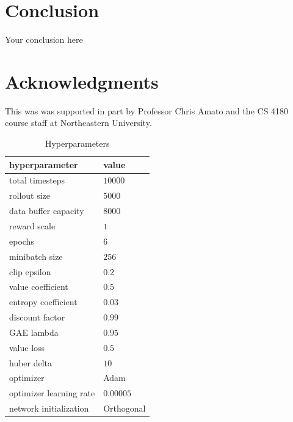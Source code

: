 \documentclass{article}
\begin{document}
\section{Conclusion}
Your conclusion here

\section*{Acknowledgments}
This was was supported in part by Professor Chris Amato and the CS 4180 course staff at Northeastern University.


\begin{table}[h]
  \caption{Hyperparameters}
   \centering
   \begin{tabular}{ll}
     \toprule
     hyperparameter     & value     \\
     \midrule
     total timesteps & $10000$ \\
     rollout size & $5000$ \\
     data buffer capacity & $8000$ \\
     reward scale & $1$ \\
     epochs & $6$ \\
     minibatch size & $256$ \\
     clip epsilon & $0.2$ \\
     value coefficient & $0.5$ \\
     entropy coefficient & $0.03$ \\
     discount factor & $0.99$ \\
     GAE lambda & $0.95$ \\
     value loss & $0.5$ \\
     huber delta & $10$ \\
     optimizer & Adam \\
     optimizer learning rate & $0.00005$ \\
     network initialization & Orthogonal \\
     \bottomrule
   \end{tabular}
   \label{tab:table}
 \end{table}

  
  
\end{document}
